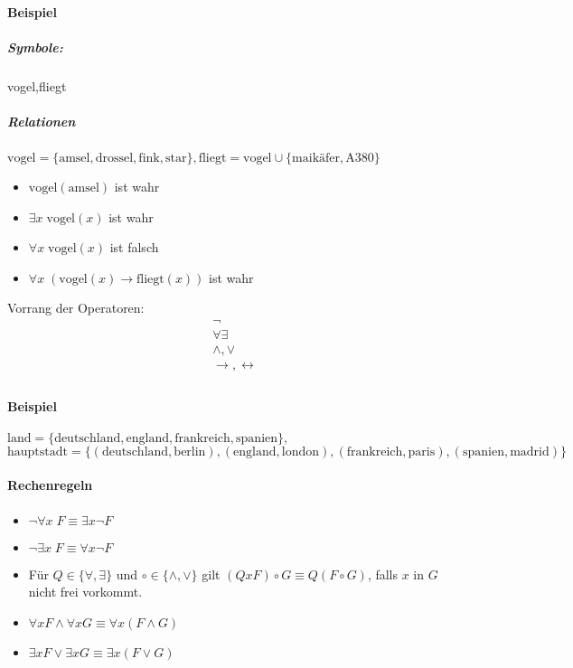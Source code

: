 \documentclass[a4paper]{scrartcl}
\begin{document}
\paragraph{Beispiel}
\subparagraph{Symbole:} vogel,fliegt
\subparagraph{Relationen} $\text{vogel} = \{\text{amsel},\text{drossel},\text{fink},\text{star}\}, \text{fliegt} = \text{vogel} \cup \{\text{maikäfer},\text{A380}\}$
\begin{itemize}
\item $\text{vogel}(\text{amsel})$ ist wahr
\item $\exists x \; \text{vogel}(x)$ ist wahr
\item $\forall x \; \text{vogel}(x)$ ist falsch
\item $\forall x \; (\text{vogel}(x) \rightarrow \text{fliegt} (x))$ ist wahr
\end{itemize}

Vorrang der Operatoren:
\[ \begin{array}{c}
\neg \\
\forall \exists\\
\wedge, \vee\\
\rightarrow  , \leftrightarrow\\
\end{array}
\]

\paragraph{Beispiel} $\text{land} = \{\text{deutschland},\text{england},\text{frankreich},\text{spanien}\},$\\ $ \text{hauptstadt} = \{(\text{deutschland},\text{berlin}),(\text{england},\text{london}),(\text{frankreich},\text{paris}),(\text{spanien},\text{madrid}) \}$

\paragraph{Rechenregeln}
\begin{itemize}
\item $\neg \forall x \; F \equiv \exists x \neg F$
\item $\neg \exists x \; F \equiv \forall x \neg F$
\item Für $Q \in \{ \forall, \exists \}$ und $\circ \in \{ \wedge, \vee \}$ gilt $(Q x F ) \circ G \equiv Q ( F \circ G )$, falls $x$ in $G$ nicht frei vorkommt.
\item $\forall x F \wedge \forall x G \equiv \forall x (F \wedge G)$
\item $\exists x F \vee \exists x G \equiv \exists x (F \vee G )$
\end{itemize}
\end{document}

